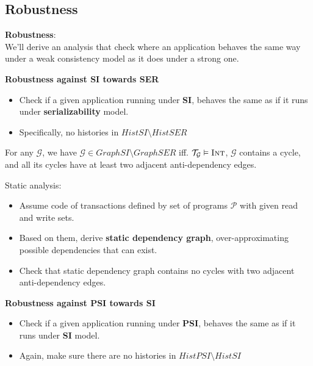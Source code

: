 \documentclass{beamer}
\begin{document}
\subsection{Robustness}

\begin{frame}
	\textbf{Robustness}: \\
	We'll derive an analysis that check where an application behaves the same way under a weak consistency model as it does under a strong one.
\end{frame}

\begin{frame}
	\textbf{Robustness against SI towards SER} \\
	\begin{itemize}
		\item Check if a given application running under \textbf{SI}, behaves the same as if it runs under \textbf{serializability} model.
		\item Specifically, no histories in $HistSI \setminus HistSER$
	\end{itemize}
\end{frame}

\begin{frame}
	\begin{theorem}
		For any $\mathcal{G}$, we have $\mathcal{G} \in GraphSI \setminus GraphSER $ iff. $\mathcal{T}_\mathcal{G} \vDash \textsc{Int}$, $\mathcal{G}$ contains a cycle, and all its cycles have at least two adjacent anti-dependency edges.
	\end{theorem}
\end{frame}

\begin{frame}
	Static analysis:
	\begin{itemize}
		\item Assume code of transactions defined by set of programs $\mathcal{P}$ with given read and write sets.
		\item Based on them, derive \textbf{static dependency graph}, over-approximating possible dependencies that can exist.
		\item Check that static dependency graph contains no cycles with two adjacent anti-dependency edges.
	\end{itemize}
\end{frame}


\begin{frame}
	\textbf{Robustness against PSI towards SI} \\
	\begin{itemize}
		\item Check if a given application running under \textbf{PSI}, behaves the same as if it runs under \textbf{SI} model.
		\item Again, make sure there are no histories in $HistPSI \setminus HistSI$
	\end{itemize}
\end{frame}
\end{document}
